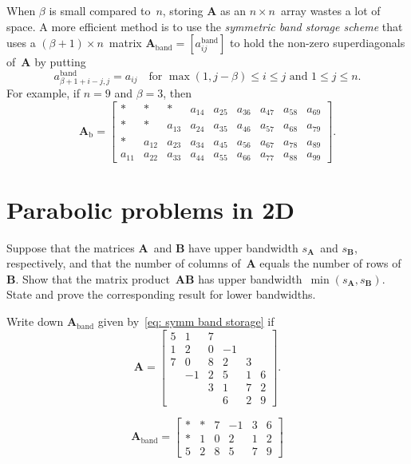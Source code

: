 When $\beta$ is small compared to~$n$, storing $\boldsymbol{A}$ as an 
$n\times n$~array wastes a lot of space.  A more efficient method is to use 
the \emph{symmetric band storage scheme} that uses a
$(\beta+1)\times n$~matrix 
$\boldsymbol{A}_{\textrm{band}}=[a^{\mathrm{band}}_{ij}]$ to hold the non-zero 
superdiagonals of~$\boldsymbol{A}$ by putting
\begin{equation}\label{eq: symm band storage}
a^{\mathrm{band}}_{\beta+1+i-j,j}=a_{ij}
	\quad\text{for $\max(1,j-\beta)\le i\le j$ and $1\le j\le n$.}
\end{equation}
For example, if $n=9$ and $\beta=3$, then
\[
\boldsymbol{A}_{\mathrm{b}}=\begin{bmatrix}
     *&     *&     *&a_{14}&a_{25}&a_{36}&a_{47}&a_{58}&a_{69}\\
     *&     *&a_{13}&a_{24}&a_{35}&a_{46}&a_{57}&a_{68}&a_{79}\\
     *&a_{12}&a_{23}&a_{34}&a_{45}&a_{56}&a_{67}&a_{78}&a_{89}\\
a_{11}&a_{22}&a_{33}&a_{44}&a_{55}&a_{66}&a_{77}&a_{88}&a_{99}           
\end{bmatrix}.
\]

\section{Parabolic problems in 2D}

\begin{Exercises}

\exercise
Suppose that the matrices $\boldsymbol{A}$~and $\boldsymbol{B}$ have upper 
bandwidth $s_{\boldsymbol{A}}$~and $s_{\boldsymbol{B}}$, respectively, and that 
the number of columns of~$\boldsymbol{A}$ equals the number of rows 
of~$\boldsymbol{B}$.  Show that the matrix 
product~$\boldsymbol{A}\boldsymbol{B}$ has upper 
bandwidth~$\min(s_{\boldsymbol{A}},s_{\boldsymbol{B}})$.  State and prove the 
corresponding result for lower bandwidths.

\exercise
Write down $\boldsymbol{A}_{\mathrm{band}}$ given 
by~\eqref{eq: symm band storage} if
\[
\boldsymbol{A}=\begin{bmatrix}
 5& 1& 7&  &  &\\
 1& 2& 0&-1&  &\\
 7& 0& 8& 2& 3&\\
  &-1& 2& 5& 1& 6\\
  &  & 3& 1& 7& 2\\
  &  &  & 6& 2& 9
\end{bmatrix}.
\]
\begin{ans}
\[
\boldsymbol{A}_{\mathrm{band}}=\begin{bmatrix}
 *& *& 7&-1& 3& 6\\
 *& 1& 0& 2& 1& 2\\
 5& 2& 8& 5& 7& 9                                
\end{bmatrix}
\]

\end{ans}


\end{Exercises}
